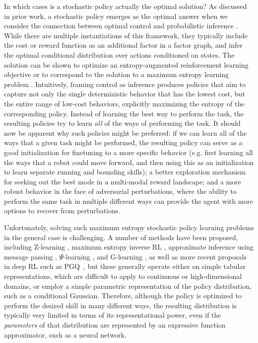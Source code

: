 \documentclass{article}
\begin{document}
%
In which cases is a stochastic policy actually the optimal solution? As discussed in prior work, a stochastic policy emerges as the optimal answer when we consider the connection between optimal control and probabilistic inference \cite{todorov2008general}. While there are multiple instantiations of this framework, they typically include the cost or reward function as an additional factor in a factor graph, and infer the optimal conditional distribution over actions conditioned on states. The solution can be shown to optimize an entropy-augmented reinforcement learning objective or to correspond to the solution to a maximum entropy learning problem \cite{toussaint2009robot}.
Intuitively, framing control as inference produces policies that aim to capture not only the single deterministic behavior that has the lowest cost, but the entire range of low-cost behaviors, explicitly maximizing the entropy of the corresponding policy. Instead of learning the best way to perform the task, the resulting policies try to learn \emph{all} of the ways of performing the task. It should now be apparent why such policies might be preferred: if we can learn all of the ways that a given task might be performed, the resulting policy can serve as a good initialization for finetuning to a more specific behavior (e.g. first learning all the ways that a robot could move forward, and then using this as an initialization to learn separate running and bounding skills); a better exploration mechanism for seeking out the best mode in a multi-modal reward landscape; and a more robust behavior in the face of adversarial perturbations, where the ability to perform the same task in multiple different ways can provide the agent with more options to recover from perturbations.

%
Unfortunately, solving such maximum entropy stochastic policy learning problems in the general case is challenging. A number of methods have been proposed, including Z-learning \cite{todorov2006linearly}, maximum entropy inverse RL \cite{ziebart2008maximum}, approximate inference using message passing \cite{toussaint2009robot}, $\Psi$-learning \cite{rawlik2012stochastic}, and G-learning \cite{fox2015taming}, as well as more recent proposals in deep RL such as PGQ~\cite{o2016pgq},
but these generally operate either on simple tabular representations, which are difficult to apply to continuous or high-dimensional domains, or employ a simple parametric representation of the policy distribution, such as a conditional Gaussian. Therefore, although the policy is optimized to perform the desired skill in many different ways,
%
the resulting distribution is typically very limited in terms of its representational power, even if the \emph{parameters} of that distribution
are represented by an expressive function approximator, such as a neural network.
\end{document}
